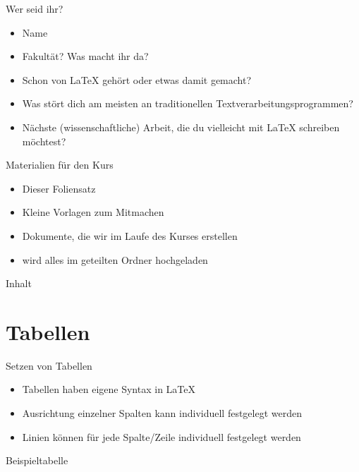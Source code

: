 \documentclass[presentation,aspectratio=169]{beamer}
\begin{document}

\begin{frame}{Wer seid ihr?}
  \begin{itemize}
    \item Name
    \item Fakultät? Was macht ihr da?
    \item Schon von \LaTeX{} gehört oder etwas damit gemacht?
    \item Was stört dich am meisten an traditionellen Textverarbeitungsprogrammen?
    \item Nächste (wissenschaftliche) Arbeit, die du vielleicht mit \LaTeX{} schreiben möchtest?
  \end{itemize}
\end{frame}

\begin{frame}{Materialien für den Kurs}
  \begin{itemize}
    \item Dieser Foliensatz
    \item Kleine Vorlagen zum Mitmachen
    \item Dokumente, die wir im Laufe des Kurses erstellen
      \bigskip
    \item wird alles im geteilten Ordner hochgeladen
  \end{itemize}
\end{frame}

\begin{frame}{Inhalt}
  \tableofcontents
\end{frame}

\section{Tabellen}

\begin{frame}{Setzen von Tabellen}
  \begin{itemize}
    \item Tabellen haben eigene Syntax in \LaTeX
    \item Ausrichtung einzelner Spalten kann individuell festgelegt werden
    \item Linien können für jede Spalte/Zeile individuell festgelegt werden
  \end{itemize}
\end{frame}

\begin{frame}[fragile]{Beispieltabelle}
  \begin{columns}
    \begin{column}{.49\textwidth}
      
    \end{column}
    \begin{column}{.5\textwidth}
      \inputminted{latex}{codebeispiele/table-simple.tex}
    \end{column}
  \end{columns}
\end{frame}
\end{document}
